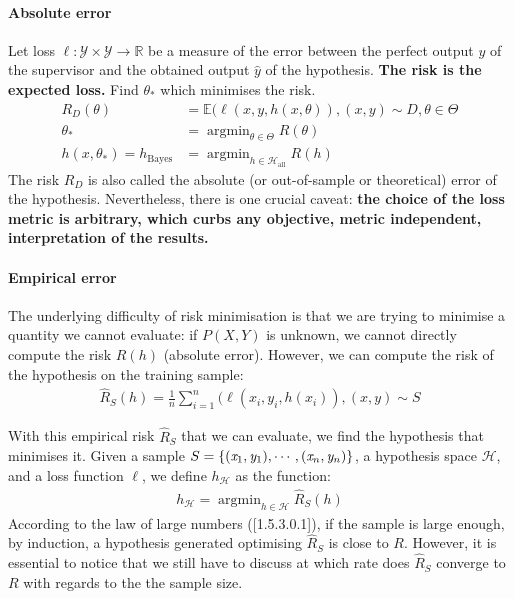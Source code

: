 \documentclass[
  letterpaper,
  12pt,
  british]{tufte-book}
\let\oldparagraph\paragraph
\renewcommand{\paragraph}[1]{\oldparagraph{#1}\mbox{}}
\theoremstyle{plain}
\theoremstyle{definition}
\theoremstyle{plain}
\theoremstyle{remark}
\begin{document}
\hypertarget{absolute-error}{%
\paragraph{Absolute error}\label{absolute-error}}

Let loss \(\ell:\mathcal{Y}\times \mathcal{Y}\to \mathbb{R}\) be a
measure of the error between the perfect output \(\mathit{y}\) of the
supervisor and the obtained output \(\hat{\mathit{y}}\) of the
hypothesis. \textbf{The risk is the expected loss.} Find \(\theta_*\)
which minimises the risk. \begin{align}
    R_{D}(\theta) &= \mathbb{E}(\ell(\mathit{x}, \mathit{y}, h(\mathit{x}, \theta)), (\mathit{x}, \mathit{y})\sim D, \theta \in \Theta\\
    \theta_{*}&= \mathop{\mathrm{argmin}}_{\theta \in \Theta} R(\theta)\\
    h(\mathit{x},\theta_*) = h_{\text{Bayes}} &= \mathop{\mathrm{argmin}}_{h \in \mathcal{H}_{\text{all}}} R(h)
\end{align} The risk \(R_{D}\) is also called the absolute (or
out-of-sample or theoretical) error of the hypothesis. Nevertheless, there is one crucial caveat: \textbf{the
choice of the loss metric is arbitrary, which curbs any objective,
metric independent, interpretation of the results.}

\hypertarget{empirical-error}{%
\paragraph{Empirical error}\label{empirical-error}}

The underlying difficulty of risk minimisation is that we are trying to
minimise a quantity we cannot evaluate: if \(P(\mathit{X},\mathit{Y})\)
is unknown, we cannot directly compute the risk \(R(h)\) (absolute
error). However, we can compute the risk of the hypothesis on the
training sample: \begin{align}
    \hat{R}_{S}(h) = \frac{1}{n} \sum_{i=1}^{n}(\ell(\mathit{x}_i, \mathit{y}_i, h(\mathit{x}_i)), (\mathit{x},\mathit{y})\sim S
\end{align}

With this empirical risk \(\hat{R}_{S}\) that we can evaluate, we find
the hypothesis that minimises it. Given a sample
\(S = \small \{(\mathit{x}_1,\mathit{y}_1),\cdots,(\mathit{x}_n, \mathit{y}_n)\}\normalsize\),
a hypothesis space \(\mathcal{H}\), and a loss function \(\ell\), we
define \(h_{\mathcal{H}}\) as the function: \begin{align}
    h_{\mathcal{H}} = \mathop{\mathrm{argmin}}_{h\in \mathcal{H}} \hat{R}_{S}(h)
\end{align} According to the law of large numbers ({[}1.5.3.0.1{]}), if
the sample is large enough, by induction, a hypothesis generated
optimising \(\hat{R}_{S}\) is close to \(R\). However, it is essential
to notice that we still have to discuss at which rate does
\(\hat{R}_{S}\) converge to \(R\) with regards to the the sample size.
\end{document}
